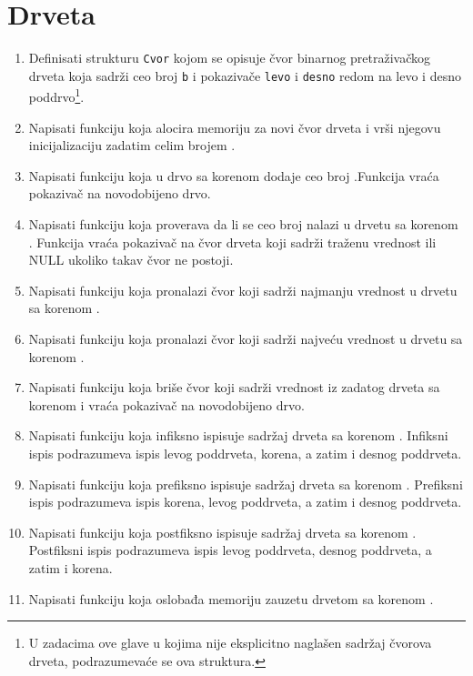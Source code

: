 
\section{Drveta}

\begin{Exercise}[label=701]
\begin{enumerate}
\item Definisati strukturu \verb|Cvor| kojom se opisuje čvor binarnog pretraživačkog drveta koja sadrži ceo broj \verb|b| i pokazivače \verb|levo| i \verb|desno| redom na levo i desno poddrvo\footnote{U zadacima ove glave u kojima nije eksplicitno naglašen sadržaj čvorova drveta, podrazumevaće se ova struktura.}.
\item Napisati funkciju  koja alocira memoriju za novi čvor drveta i vrši njegovu inicijalizaciju zadatim celim brojem .
\item Napisati funkciju  koja u drvo sa korenom  dodaje ceo broj .Funkcija vraća pokazivač na novodobijeno drvo.
\item Napisati funkciju  koja proverava da li se ceo broj  nalazi u drvetu sa korenom . Funkcija vraća pokazivač na čvor drveta koji sadrži traženu vrednost ili NULL ukoliko takav čvor ne postoji.
\item Napisati funkciju  koja pronalazi čvor koji sadrži najmanju vrednost u drvetu sa korenom .
\item Napisati funkciju  koja pronalazi čvor koji sadrži najveću vrednost u drvetu sa korenom .
\item Napisati funkciju  koja briše čvor koji sadrži vrednost  iz zadatog drveta sa korenom  i vraća pokazivač na novodobijeno drvo.    
\item Napisati funkciju  koja infiksno ispisuje sadržaj drveta sa korenom . Infiksni ispis podrazumeva ispis levog poddrveta, korena, a zatim i desnog poddrveta.
\item Napisati funkciju  koja prefiksno ispisuje sadržaj drveta sa korenom . Prefiksni ispis podrazumeva ispis korena, levog poddrveta, a zatim i desnog poddrveta.
\item Napisati funkciju  koja postfiksno ispisuje sadržaj drveta sa korenom . Postfiksni ispis podrazumeva ispis levog poddrveta, desnog poddrveta, a zatim i korena.
\item Napisati funkciju  koja oslobađa memoriju zauzetu drvetom sa korenom .
\end{enumerate}


\end{Exercise}
